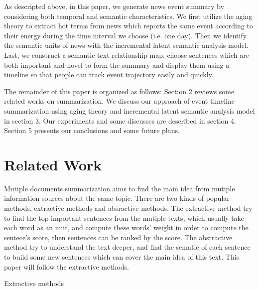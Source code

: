 \documentclass[runningheads,a4paper]{llncs}
\begin{document}
As descripted above, in this paper, we generate news event summary by considering both temporal and semantic characteristics. We first utilize the aging theory \cite{2003-Chen-p47-59} to extract hot terms from news which reports the same event according to their energy during the time interval we choose (i.e. one day). Then we identify the semantic units of news with the incremental latent semantic analysis model. Last, we construct a semantic text relationship map, choose sentences which are both important and novel to form the summary and display them using a timeline so that people can track event trajectory easily and quickly.

The remainder of this paper is organized as follows: Section 2 reviews some related works on summarization. We discuss our approach of event timeline summarization using aging theory and incremental latent semantic analysis model in section 3. Our experiments and some discusses are described in section 4. Section 5 presents our conclusions and some future plans.

\section{Related Work}

Mutiple documents summarization aims to find the main idea from mutiple information sources about the same topic. There are two kinds of popular methods, extractive methods and absractive methods. The extractive method try to find the top important sentences from the mutiple texts, which usually take each word as an unit, and compute these words' weight in order to compute the sentece's score, then sentences can be ranked by the score. The abstractive method try to understand the text deeper, and find the sematic of each sentence to build some new sentences which can cover the main idea of this text. This paper will follow the extractive methods.

Extractive methods
\end{document}
